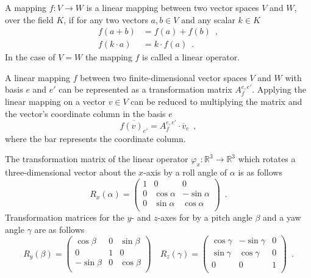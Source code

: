\documentclass[12pt]{article}
\author{Mart-Mihkel Aun}
\begin{document}
\thispagestyle{empty}

A mapping $f : V \rightarrow W$ is a linear mapping between two vector spaces $V$ and $W$, over the field $K$, if for any two vectors $a , b \in V$ and any scalar $k \in K$
\begin{align*}
	f(a + b) &= f(a) + f(b) \enspace , \\
	f(k \cdot a) &= k \cdot f(a) \enspace .
\end{align*}
In the case of $V = W$ the mapping $f$ is called a linear operator.

A linear mapping $f$ between two finite-dimensional vector spaces $V$ and $W$ with basis $e$ and $e'$ can be represented as a transformation matrix $A_f^{e , e'}$.
Applying the linear mapping on a vector $v \in V$ can be reduced to multiplying the matrix and the vector's coordinate column in the basis $e$
\begin{equation*}
	\overline{f(v)_{e'}} = A_f^{e , e'} \cdot \overline{v}_e \enspace ,
\end{equation*}
where the bar represents the coordinate column.

The transformation matrix of the linear operator $\varphi_x : \mathbb{R}^3 \rightarrow \mathbb{R}^3$ which rotates a three-dimensional vector about the $x$-axis by a roll angle of $\alpha$ is as follows
\begin{equation*}
	R_x(\alpha) =
	\begin{pmatrix}
		1 & 0 & 0 \\
		0 & \cos \alpha & - \sin \alpha \\
		0 & \sin \alpha & \cos \alpha   \\
	\end{pmatrix}
	\enspace .
\end{equation*}
Transformation matrices for the $y$- and $z$-axes for by a pitch angle $\beta$ and a yaw angle $\gamma$ are as follows
\begin{equation*}
	R_y(\beta) =
	\begin{pmatrix}
		\cos \beta & 0 & \sin \beta \\
		0 & 1 & 0 \\
		- \sin \beta & 0 & \cos \beta \\
	\end{pmatrix}
	\quad
	R_z(\gamma) =
	\begin{pmatrix}
		\cos \gamma & - \sin \gamma & 0 \\
		\sin \gamma & \cos \gamma & 0 \\
		0 & 0 & 1 \\
	\end{pmatrix}
	\enspace .
\end{equation*}
\end{document}

